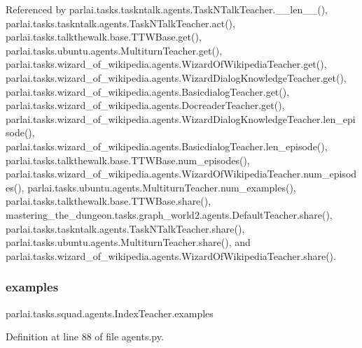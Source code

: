 Referenced by parlai.\+tasks.\+taskntalk.\+agents.\+Task\+N\+Talk\+Teacher.\+\_\+\+\_\+len\+\_\+\+\_\+(), parlai.\+tasks.\+taskntalk.\+agents.\+Task\+N\+Talk\+Teacher.\+act(), parlai.\+tasks.\+talkthewalk.\+base.\+T\+T\+W\+Base.\+get(), parlai.\+tasks.\+ubuntu.\+agents.\+Multiturn\+Teacher.\+get(), parlai.\+tasks.\+wizard\+\_\+of\+\_\+wikipedia.\+agents.\+Wizard\+Of\+Wikipedia\+Teacher.\+get(), parlai.\+tasks.\+wizard\+\_\+of\+\_\+wikipedia.\+agents.\+Wizard\+Dialog\+Knowledge\+Teacher.\+get(), parlai.\+tasks.\+wizard\+\_\+of\+\_\+wikipedia.\+agents.\+Basicdialog\+Teacher.\+get(), parlai.\+tasks.\+wizard\+\_\+of\+\_\+wikipedia.\+agents.\+Docreader\+Teacher.\+get(), parlai.\+tasks.\+wizard\+\_\+of\+\_\+wikipedia.\+agents.\+Wizard\+Dialog\+Knowledge\+Teacher.\+len\+\_\+episode(), parlai.\+tasks.\+wizard\+\_\+of\+\_\+wikipedia.\+agents.\+Basicdialog\+Teacher.\+len\+\_\+episode(), parlai.\+tasks.\+talkthewalk.\+base.\+T\+T\+W\+Base.\+num\+\_\+episodes(), parlai.\+tasks.\+wizard\+\_\+of\+\_\+wikipedia.\+agents.\+Wizard\+Of\+Wikipedia\+Teacher.\+num\+\_\+episodes(), parlai.\+tasks.\+ubuntu.\+agents.\+Multiturn\+Teacher.\+num\+\_\+examples(), parlai.\+tasks.\+talkthewalk.\+base.\+T\+T\+W\+Base.\+share(), mastering\+\_\+the\+\_\+dungeon.\+tasks.\+graph\+\_\+world2.\+agents.\+Default\+Teacher.\+share(), parlai.\+tasks.\+taskntalk.\+agents.\+Task\+N\+Talk\+Teacher.\+share(), parlai.\+tasks.\+ubuntu.\+agents.\+Multiturn\+Teacher.\+share(), and parlai.\+tasks.\+wizard\+\_\+of\+\_\+wikipedia.\+agents.\+Wizard\+Of\+Wikipedia\+Teacher.\+share().

\mbox{\label{classparlai_1_1tasks_1_1squad_1_1agents_1_1IndexTeacher_a2ab5fd73dc8ce2b290aebd13f40540b5}} 
\subsubsection{\texorpdfstring{examples}{examples}}
{\footnotesize\ttfamily parlai.\+tasks.\+squad.\+agents.\+Index\+Teacher.\+examples}



Definition at line 88 of file agents.\+py.

\mbox{\label{classparlai_1_1tasks_1_1squad_1_1agents_1_1IndexTeacher_a7c35d02788f1d513a7b815083cfecbf8}} 

